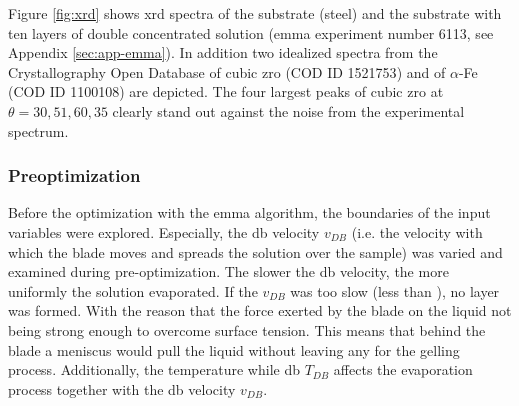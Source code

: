 Figure \ref{fig:xrd} shows \gls{xrd} spectra of the substrate (steel) and 
the substrate with ten layers of double concentrated solution (\gls{emma} experiment number 6113, see Appendix \ref{sec:app-emma}).
In addition two idealized spectra from the Crystallography Open Database of cubic \gls{zro} (COD ID 1521753\cite{gkatz1971xray}) and of $\alpha$-Fe (COD ID 1100108) are depicted.
The four largest peaks of cubic \gls{zro} at $\theta=30, 51, 60, 35$ clearly stand out against the noise from the experimental spectrum. %

\subsubsection{Preoptimization}
Before the optimization with the \gls{emma} algorithm, 
the boundaries of the input variables were explored. 
Especially, the \gls{db} velocity $v_{DB}$ (i.e. the velocity with which the blade moves and spreads the solution over the sample)
was varied and examined during pre-optimization. 
The slower the \gls{db} velocity, the more uniformly the solution evaporated. 
If the $v_{DB}$ was too slow (less than ), no layer was formed. 
With the reason that the force exerted by the blade on the liquid not being strong enough to overcome surface tension. 
This means that behind the blade a meniscus would pull the liquid without leaving any for the gelling process. 
Additionally, the temperature while \gls{db} $T_{DB}$ affects the evaporation process together with the \gls{db} velocity $v_{DB}$. 


